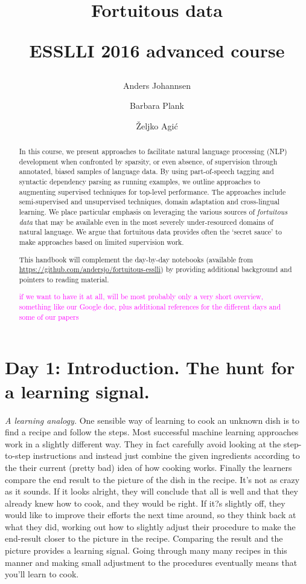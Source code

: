 \documentclass{article}
\title{Fortuitous data \\\begin{small}ESSLLI 2016 advanced course\end{small}}
\author{Anders Johannsen \and Barbara Plank \and Željko Agi\'{c}}
\date{}
\begin{document}
\maketitle



\begin{abstract}
In this course, we present approaches to facilitate natural language processing (NLP) development when confronted by sparsity, or even absence, of supervision through annotated, biased samples of language data. By using part-of-speech tagging and syntactic dependency parsing as running examples, we outline approaches to augmenting supervised techniques for top-level performance. The approaches include semi-supervised and unsupervised techniques, domain adaptation and cross-lingual learning. We place particular emphasis on leveraging the various sources of \textit{fortuitous data} that may be available even in the most severely under-resourced domains of natural language. We argue that fortuitous data provides often the `secret sauce' to make approaches based on limited supervision work. 

This handbook will complement the day-by-day notebooks (available from \url{https://github.com/andersjo/fortuitous-esslli}) by providing additional background and pointers to reading material.

\textcolor{magenta}{if we want to have it at all, will be most probably only a very short overview, something like our Google doc, plus additional references for the different days and some of our papers}
\end{abstract}

\section{Day 1: Introduction. The hunt for a learning signal.}


\textit{A learning analogy.} One sensible way of learning to cook an unknown dish is to find a recipe and follow the steps. Most successful machine learning approaches work in a slightly different way. They in fact carefully avoid looking at the step-to-step instructions and instead just combine the given ingredients according to the their current (pretty bad) idea of how cooking works. Finally the learners compare the end result to the picture of the dish in the recipe. It's not as crazy as it sounds. If it looks alright, they will conclude that all is well and that they already knew how to cook, and they would be right. If it?s slightly off, they would like to improve their efforts the next time around, so they think back at what they did, working out how to slightly adjust their procedure to make the end-result closer to the picture in the recipe. Comparing the result and the picture provides a learning signal. Going through many many recipes in this manner and making small adjustment to the procedures eventually means that you'll learn to cook. 
\end{document}
